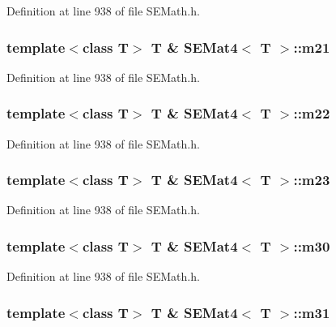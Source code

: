 Definition at line 938 of file S\+E\+Math.\+h.

\subsubsection[{m21}]{\setlength{\rightskip}{0pt plus 5cm}template$<$class T$>$ T \& {\bf S\+E\+Mat4}$<$ T $>$\+::m21}\label{class_s_e_mat4_a70934a5f82b80ba5adaecf80da49e733}


Definition at line 938 of file S\+E\+Math.\+h.

\subsubsection[{m22}]{\setlength{\rightskip}{0pt plus 5cm}template$<$class T$>$ T \& {\bf S\+E\+Mat4}$<$ T $>$\+::m22}\label{class_s_e_mat4_ae9eb00d7ee046d8ede5695f571e75e45}


Definition at line 938 of file S\+E\+Math.\+h.

\subsubsection[{m23}]{\setlength{\rightskip}{0pt plus 5cm}template$<$class T$>$ T \& {\bf S\+E\+Mat4}$<$ T $>$\+::m23}\label{class_s_e_mat4_a14f542300b9d3ff6e5c7aef7c7daba4e}


Definition at line 938 of file S\+E\+Math.\+h.

\subsubsection[{m30}]{\setlength{\rightskip}{0pt plus 5cm}template$<$class T$>$ T \& {\bf S\+E\+Mat4}$<$ T $>$\+::m30}\label{class_s_e_mat4_a44a29df7eab0c837e032c4ea3172f960}


Definition at line 938 of file S\+E\+Math.\+h.

\subsubsection[{m31}]{\setlength{\rightskip}{0pt plus 5cm}template$<$class T$>$ T \& {\bf S\+E\+Mat4}$<$ T $>$\+::m31}\label{class_s_e_mat4_af880cc2848cb9ded3a9c9a0cd9d0df19}


